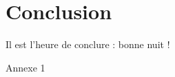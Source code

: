 \documentclass{themeensg}
\begin{document}
\newevenpage
\chapter*{Conclusion}
  \vspace{1.5cm}
Il est l'heure de conclure : bonne nuit !


\newevenpage
\nocite{*}



\newevenpage
\begin{appendices} 
\label{beginappendices}
\label{annexekalman}
Annexe 1

\end{appendices} 
\end{document}
